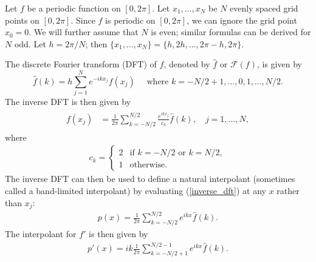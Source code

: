 \label{lab:pseudospectral2}


Let $f$ be a periodic function on $[0,2\pi]$. Let $x_1,\ldots,x_N$ be $N$ evenly spaced grid points on $[0,2\pi].$ Since $f$ is periodic on $[0,2\pi]$, we can ignore the grid point $x_0 = 0$. We will further assume that $N$ is even; similar formulas can be derived for $N$ odd. Let $h = 2\pi/N$; then $\{x_1,\ldots,x_N\} = \{h,2h,\ldots,2\pi-h,2\pi\}$.  

The discrete Fourier transform (DFT) of $f$, denoted by $\hat{f}$ or $\mathcal{F}(f)$, is given by
\[
\hat{f}(k) = h \sum_{j=1}^N e^{-ikx_j}f(x_j) \quad \text{ where } k = -N/2+1, \ldots,0,1,\ldots, N/2.
\]
The inverse DFT is then given by
\begin{align}
\begin{split}
f(x_j) &= \frac{1}{2\pi}\sum_{k=-N/2}^{N/2}\frac{e^{ikx_j}}{c_k}\hat{f}(k), \quad j = 1,\ldots, N,
\end{split}\label{inverse_dft}
\end{align}
where %
\begin{align}
	c_k = \begin{cases} 2 & \text{if }k = -N/2 \text{ or }k = N/2, \\ 1 &  \text{otherwise.}
\end{cases}
\end{align}
The inverse DFT can then be used to define a natural interpolant (sometimes called a band-limited interpolant) by evaluating (\ref{inverse_dft}) at any $x$ rather than $x_j$:
\begin{align}
p(x) = \frac{1}{2\pi}\sum_{k=-N/2}^{N/2} e^{ikx}\hat{f}(k). \label{interpolant}
\end{align}
The interpolant for $f'$ is then given by 
\begin{align}
p'(x) = ik \frac{1}{2\pi}\sum_{k=-N/2+1}^{N/2-1} e^{ikx}\hat{f}(k). \label{spectral2:deriv}
\end{align}



